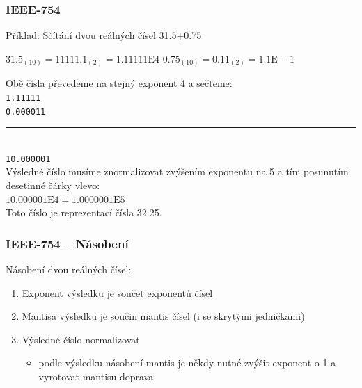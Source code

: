 \begin{frame}
\frametitle{IEEE-754}

Příklad: Sčítání dvou reálných čísel 31.5+0.75

$31.5_{(10)} = 11111.1_{(2)} = 1.11111\text{E}4$ \phantom{xxx} $0.75_{(10)} = 0.11_{(2)} = 1.1\text{E}-1$

\bigskip
Obě čísla převedeme na stejný exponent 4 a sečteme:\\
\texttt{\phantom{xx}1.11111}\\
\texttt{\phantom{xx}0.000011}\vspace{-6pt}\\
\rule[0pt]{2cm}{0.4pt}\\
\texttt{\phantom{x}10.000001}\\

Výsledné číslo musíme znormalizovat zvýšením exponentu na 5 a tím posunutím desetinné čárky vlevo:\\
$10.000001\text{E}4 = 1.0000001\text{E}5$\\

Toto číslo je reprezentací čísla 32.25.

\end{frame}

\begin{frame}
\frametitle{IEEE-754 -- Násobení}

Násobení dvou reálných čísel:
\begin{enumerate}
\item Exponent výsledku je součet exponentů čísel
\item Mantisa výsledku je součin mantis čísel (i se skrytými jedničkami)
\item Výsledné číslo normalizovat
\begin{itemize}
\item podle výsledku násobení mantis je někdy nutné zvýšit exponent o 1 a vyrotovat mantisu doprava
\end{itemize}
\end{enumerate}
\end{frame}

